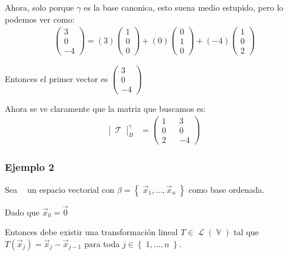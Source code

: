 \documentclass[12pt, fleqn]{report}                             %
\theoremstyle{break}                                            %
\DeclareMathOperator \GenericField {\mathbb{F}}                 %
\DeclareMathOperator \VectorSet    {\mathbb{V}}                 %
\DeclareMathOperator \VectorSpace  {\VectorSet_{\GenericField}} %
\DeclareMathOperator \LinTrans {\mathcal{T}}                    %
\DeclareMathOperator \Laplace {\mathcal{L}}                     %
\newcommand{\Set}[1]    {\left\{ \; #1 \; \right\}}             %
\newcommand{\bigBrackets}[1] {\big[ \; #1 \; \big]}             %
\newcommand{\pVector}[1]                                        %
        { \ensuremath{\begin{pmatrix}#1\end{pmatrix}} }             %
\begin{document}
\begin{itemize}
                            Ahora, solo porque $\gamma$ es la base canonica, esto suena medio estupido, pero
                            lo podemos ver como:
                            \begin{align*}
                                \pVector{3\\0\\-4} 
                                    = (3)\pVector{1\\0\\0} + (0)\pVector{0\\1\\0} + (-4)\pVector{1\\0\\2}
                            \end{align*}

                            Entonces el primer vector es $\pVector{3\\0\\-4}$

                    \end{itemize}

                    Ahora se ve claramente que la matriz que buscamos es:
                    \begin{align*}
                        \bigBrackets{\LinTrans}_{B}^{\gamma}
                            &= \pVector{1 && 3 \\ 0 && 0 \\ 2 && -4}
                    \end{align*}

                \clearpage
                \subsubsection{Ejemplo 2}

                    Sea $\VectorSpace$ un espacio vectorial con $\beta = \Set{\vec x_1, \dots , \vec x_n}$ 
                    como base ordenada.

                    Dado que $\vec x_0 = \vec 0$

                    Entonces debe existir una transformación lineal $T \in \Laplace(\VectorSet)$ tal
                    que $T(\vec x_j) = \vec x_j - \vec x_{j - 1}$ para toda $j \in \Set{1, \dots, n}$.
\end{document}
